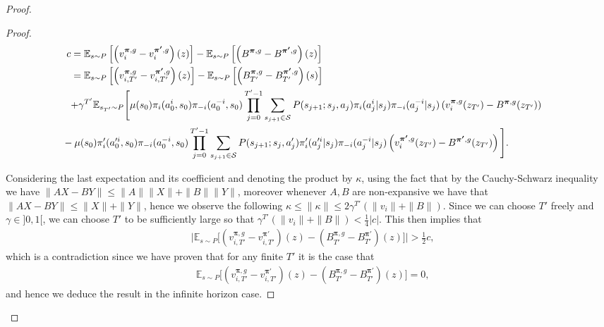 \documentclass{article}
\begin{document}
\begin{proof}
\begin{proof}
\begin{align*}\nonumber
c&=\mathbb{E}_{s\sim P}\left[\left(v_{i}^{\boldsymbol{\pi},g}-v_{i}^{\boldsymbol{\pi'},g}\right)(z)\right]-\mathbb{E}_{s\sim P}\left[\left(B^{\boldsymbol{\pi},g}-B^{\boldsymbol{\pi'},g}\right)(z)\right]
\\&\nonumber
=\mathbb{E}_{s\sim P}\left[\left(v_{i,T'}^{\boldsymbol{\pi},g}-v_{i,T'}^{\boldsymbol{\pi'},g}\right)(z)\right]
-\mathbb{E}_{s\sim P}\left[\left(B_{T'}^{\boldsymbol{\pi},g}-B_{T'}^{\boldsymbol{\pi'},g}\right)(s)\right]
\\&\begin{aligned}
+\gamma^{T'}\mathbb{E}_{s_{T'}\sim P}\Bigg[\mu(s_0)\pi_i(a^i_0,s_0)\pi_{-i}(a^{-i}_0,s_0)\prod_{j=0}^{T'-1}\sum_{s_{j+1}\in \mathcal{S}}P(s_{j+1};s_j,a_j)\pi_i(a^i_j|s_j)\pi_{-i}(a^{-i}_j|s_j)
\left(v_{i}^{\boldsymbol{\pi},g}(z_{T'})-B^{\boldsymbol{\pi},g}(z_{T'})\right)&\nonumber
\end{aligned}
\\&\hspace{-3 mm}
-\mu(s_0)\pi'_i(a'^i_0,s_0)\pi_{-i}(a^{-i}_0,s_0)\prod_{j=0}^{T'-1}\sum_{s_{j+1}\in \mathcal{S}}P(s_{j+1};s_j,a'_j)\pi'_i(a'^i_j|s_j)\pi_{-i}(a^{-i}_j|s_j)
\left(v_{i}^{\boldsymbol{\pi'},g}(z_{T'})-B^{\boldsymbol{\pi'},g}(z_{T'})\right)\Bigg].
\end{align*}

Considering the last expectation and its coefficient and denoting the product by $\kappa$, using the fact that by the Cauchy-Schwarz inequality we have $\|AX-BY\|\leq \|A\|\|X\|+\|B\|\|Y\|$, moreover whenever $A,B$ are non-expansive we have that $\|AX - BY \| \leq \|X\| + \|Y \|$, hence we observe the following $
\kappa\leq\|\kappa\|\leq 2\gamma^{T'}\left(\|v_{i}\|+\|B\|\right)$. Since we can choose $T'$ freely and $\gamma \in ]0,1[$, we can choose $T'$ to be sufficiently large so that $
\gamma^{T'}\left(\|v_{i}\|+\|B\|\right)<\frac{1}{4}|c|$.
This then implies that
\begin{align*}
&\Bigg|\mathbb{E}_{s\sim P}\Bigg[\left(v_{i,T'}^{\boldsymbol{\pi},g}-v_{i,T'}^{\boldsymbol{\pi'}}\right)(z)
-\left(B_{T'}^{\boldsymbol{\pi},g}-B_{T'}^{\boldsymbol{\pi'}}\right)(z)\Bigg]\Bigg|
>\frac{1}{2}c,    
\end{align*}
which is a contradiction since we have proven that for any finite $T'$ it is the case that
\begin{align}\nonumber
&\mathbb{E}_{s\sim P}\Bigg[\left(v_{i,T'}^{\boldsymbol{\pi},g}-v_{i,T'}^{\boldsymbol{\pi'}}\right)(z)
-\left(B_{T'}^{\boldsymbol{\pi},g}-B_{T'}^{\boldsymbol{\pi'}}\right)(z)\Bigg]=0,
\end{align}
and hence we deduce the result in the infinite horizon case.
\end{proof}

\end{proof}
\end{document}
